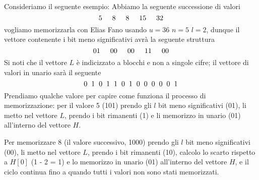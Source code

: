 Consideriamo il seguente esempio: Abbiamo la seguente successione di valori
\begin{equation*}
    5\hspace{5mm}8\hspace{5mm}8\hspace{5mm}15\hspace{5mm}32
\end{equation*}
vogliamo memorizzarla con Elias Fano usando $u = 36$ $n = 5$ $l = 2$, dunque il vettore contenente i bit meno significativi avrà la seguente struttura
\begin{equation*}
    01\hspace{5mm}00\hspace{5mm}00\hspace{5mm}11\hspace{5mm}00
\end{equation*}
Si noti che il vettore $L$ è indicizzato a blocchi e non a singole cifre; il vettore di valori in unario sarà il seguente
\begin{equation*}
    0\hspace{2mm}1\hspace{2mm}0\hspace{2mm}1\hspace{2mm}1\hspace{2mm}0\hspace{2mm}1\hspace{2mm}0\hspace{2mm}0\hspace{2mm}0\hspace{2mm}0\hspace{2mm}0\hspace{2mm}1
\end{equation*}
Prendiamo qualche valore per capire come funziona il processo di memorizzazione:
per il valore 5 (101) prendo gli $l$ bit meno significativi (01), li metto nel vettore $L$, prendo i bit rimanenti (1) e li memorizzo in unario (01) all'interno del vettore $H$.

Per memorizzare 8 (il valore successivo, 1000) prendo gli $l$ bit meno significativi (00), li metto nel vettore $L$, prendo i bit rimanenti (10), calcolo lo scarto rispetto a $H[0]$ (1 - 2 = 1) e lo memorizzo in unario (01) all'interno del vettore $H$, e il ciclo continua fino a quando tutti i valori non sono stati memorizzati.

